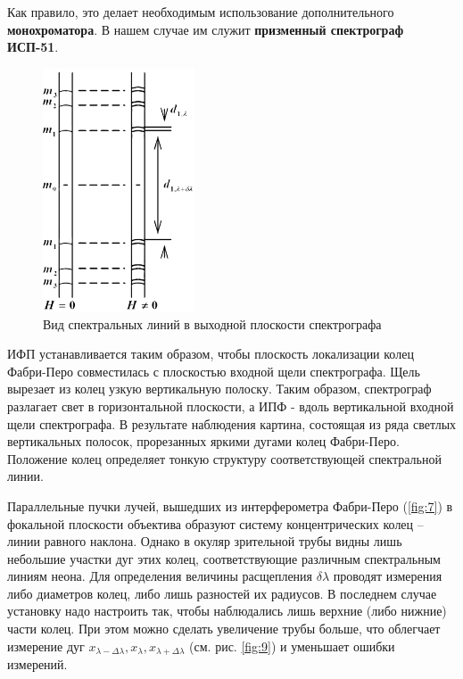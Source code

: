 Как правило, это делает необходимым использование дополнительного \textbf{монохроматора}. В нашем случае им служит \textbf{призменный спектрограф ИСП-51}.
\begin{figure}[H]
	\begin{center}
	\includegraphics[width=0.4\textwidth]{fig/fig8.jpg}
	\caption{Вид спектральных линий в выходной плоскости спектрографа}\label{fig:8}
\end{center}

\end{figure}
ИФП устанавливается таким образом, чтобы плоскость локализации колец Фабри-Перо совместилась с плоскостью входной щели спектрографа. Щель вырезает из колец узкую вертикальную полоску. Таким образом, спектрограф разлагает свет в горизонтальной плоскости, а ИПФ - вдоль вертикальной входной щели спектрографа. В результате наблюдения картина, состоящая из ряда светлых вертикальных полосок, прорезанных яркими дугами колец Фабри-Перо. Положение колец определяет тонкую структуру соответствующей спектральной линии. 

Параллельные пучки лучей, вышедших из интерферометра Фабри-Перо (\ref{fig:7}) в фокальной плоскости объектива образуют систему концентрических колец -- линии равного наклона. Однако в окуляр зрительной трубы видны лишь небольшие участки дуг этих колец, соответствующие различным спектральным линиям неона. Для определения величины расщепления $\delta\lambda$ проводят измерения либо диаметров колец, либо лишь разностей их радиусов. В последнем случае установку надо настроить так, чтобы наблюдались лишь верхние (либо нижние) части колец. При этом можно сделать увеличение трубы больше, что облегчает измерение дуг $x_{\lambda-\Delta \lambda},x_{\lambda},x_{\lambda+\Delta \lambda}$ (см. рис. \ref{fig:9}) и уменьшает ошибки измерений.

